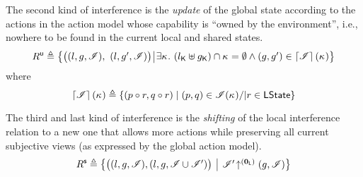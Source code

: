 The second kind of interference is the \emph{update} of the global state according to the actions in the action model whose capability is ``owned by the environment'', i.e., nowhere to be found in the current local and shared states.
%
\[	
  \updateR \eqdef
  \left\{
  \begin{array}{@{} l @{\hspace*{2pt}} | @{\hspace*{2pt}} r @{}}
    \left(
    \begin{array}{@{} l @{}}
      (l, g, \lmod),\ 
      (l, g', \lmod)
    \end{array}
    \right)
    &
    \begin{array}{@{} l @{} }
      \begin{array}{@{} l @{}}
	\exsts{\ca{} }\left( \capPart{l} \uplus \capPart{g} \right) \cap \ca{} = \emptyset\land 
	(g, g') \in \padAM{\lmod}(\ca{}) \\
      \end{array}	
    \end{array}
  \end{array}
  \right\}
\]	
%
where
%
\[
\left\lceil \mathscr{I}\right\rceil(\kappa_{}) \triangleq \left\{ (p \circ r, q \circ r) \mid (p, q) \in \mathscr{I}(\kappa_{}) /| r \in \mathsf{LState} \right\}
\]
%

The third and last kind of interference is the \emph{shifting} of the local interference relation to a new one that allows more actions while preserving all current subjective views (as expressed by the global action model).
%
\[
  \shiftR \eqdef
  \left\{
  \begin{array}{@{} l @{\hspace*{5pt}} | @{\hspace*{5pt}} r @{}}
    \left(
    \begin{array}{@{} l @{}}
      (l, g, \lmod),
      \left( l, g, \lmod \cup \lmod' \right)
    \end{array}
    \right)
    &
    \expandsAM{\lmod'}{\unitL}{g}{\lmod}
  \end{array}
  \right\}
\]


